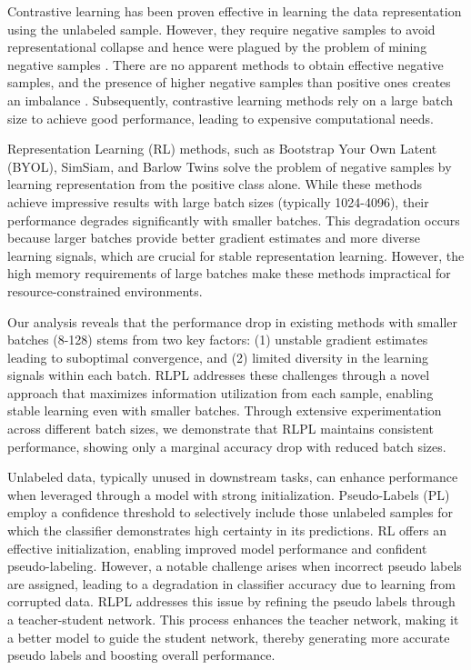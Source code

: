Contrastive learning \cite{chuang2020debiased, fan2023contrastive} has been proven effective in learning the data representation using the unlabeled sample. However, they require negative samples to avoid representational collapse \cite{aghajanyan2020better} and hence were plagued by the problem of mining negative samples \cite{radenovic2023filtering}. There are no apparent methods to obtain effective negative samples, and the presence of higher negative samples than positive ones creates an imbalance \cite{kalantidis2020hard}. Subsequently, contrastive learning methods rely on a large batch size \cite{yang2023batchsampler} to achieve good performance, leading to expensive computational needs.

Representation Learning (RL) methods, such as Bootstrap Your Own Latent (BYOL), SimSiam, and Barlow Twins solve the problem of negative samples by learning representation from the positive class alone. While these methods achieve impressive results with large batch sizes (typically 1024-4096), their performance degrades significantly with smaller batches. This degradation occurs because larger batches provide better gradient estimates and more diverse learning signals, which are crucial for stable representation learning. However, the high memory requirements of large batches make these methods impractical for resource-constrained environments.

Our analysis reveals that the performance drop in existing methods with smaller batches (8-128) stems from two key factors: (1) unstable gradient estimates leading to suboptimal convergence, and (2) limited diversity in the learning signals within each batch. RLPL addresses these challenges through a novel approach that maximizes information utilization from each sample, enabling stable learning even with smaller batches. Through extensive experimentation across different batch sizes, we demonstrate that RLPL maintains consistent performance, showing only a marginal accuracy drop with reduced batch sizes.

Unlabeled data, typically unused in downstream tasks, can enhance performance when leveraged through a model with strong initialization. Pseudo-Labels (PL) \cite{lee2013pseudo} employ a confidence threshold to selectively include those unlabeled samples for which the classifier demonstrates high certainty in its predictions. RL offers an effective initialization, enabling improved model performance and confident pseudo-labeling. However, a notable challenge arises when incorrect pseudo labels are assigned, leading to a degradation in classifier accuracy due to learning from corrupted data. RLPL addresses this issue by refining the pseudo labels through a teacher-student network. This process enhances the teacher network, making it a better model to guide the student network, thereby generating more accurate pseudo labels and boosting overall performance.

